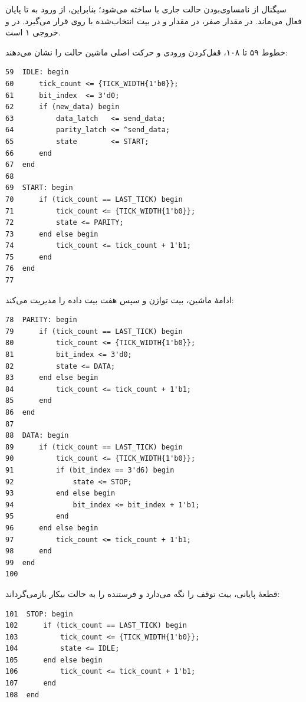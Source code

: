 سیگنال  از نامساوی‌بودن حالت جاری با  ساخته می‌شود؛ بنابراین، از ورود
به  تا پایان  فعال می‌ماند. در  مقدار صفر، در
 مقدار  و در  بیت انتخاب‌شده با
 روی  قرار می‌گیرد. در  و  خروجی ۱ است.

خطوط ۵۹ تا ۱۰۸، قفل‌کردن ورودی و حرکت اصلی ماشین حالت را نشان می‌دهند:

\begin{dsdlcodeblock}
\begin{verbatim}
59  IDLE: begin
60      tick_count <= {TICK_WIDTH{1'b0}};
61      bit_index  <= 3'd0;
62      if (new_data) begin
63          data_latch   <= send_data;
64          parity_latch <= ^send_data;
65          state        <= START;
66      end
67  end
68
69  START: begin
70      if (tick_count == LAST_TICK) begin
71          tick_count <= {TICK_WIDTH{1'b0}};
72          state <= PARITY;
73      end else begin
74          tick_count <= tick_count + 1'b1;
75      end
76  end
77
\end{verbatim}
\end{dsdlcodeblock}

ادامهٔ ماشین، بیت توازن و سپس هفت بیت داده را مدیریت می‌کند:

\begin{dsdlcodeblock}
\begin{verbatim}
78  PARITY: begin
79      if (tick_count == LAST_TICK) begin
80          tick_count <= {TICK_WIDTH{1'b0}};
81          bit_index <= 3'd0;
82          state <= DATA;
83      end else begin
84          tick_count <= tick_count + 1'b1;
85      end
86  end
87
88  DATA: begin
89      if (tick_count == LAST_TICK) begin
90          tick_count <= {TICK_WIDTH{1'b0}};
91          if (bit_index == 3'd6) begin
92              state <= STOP;
93          end else begin
94              bit_index <= bit_index + 1'b1;
95          end
96      end else begin
97          tick_count <= tick_count + 1'b1;
98      end
99  end
100
\end{verbatim}
\end{dsdlcodeblock}

قطعهٔ پایانی، بیت توقف را نگه می‌دارد و فرستنده را به حالت بیکار بازمی‌گرداند:

\begin{dsdlcodeblock}
\begin{verbatim}
101  STOP: begin
102      if (tick_count == LAST_TICK) begin
103          tick_count <= {TICK_WIDTH{1'b0}};
104          state <= IDLE;
105      end else begin
106          tick_count <= tick_count + 1'b1;
107      end
108  end
\end{verbatim}
\end{dsdlcodeblock}

